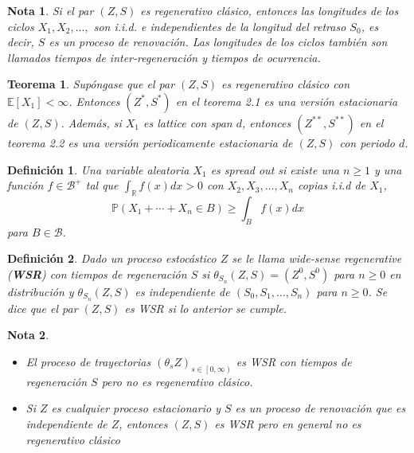 \documentclass{article}
\newtheorem{Def}{Definición}
\newtheorem{Teo}{Teorema}
\newtheorem{Note}{Nota}
\newcommand{\rea}{\mathbb{R}}
\newcommand{\esp}{\mathbb{E}}
\newcommand{\prob}{\mathbb{P}}
\begin{document}
\begin{Note}
Si el par $\left(Z,S\right)$ es regenerativo cl\'asico, entonces las longitudes de los ciclos $X_{1},X_{2},\ldots,$ son i.i.d. e independientes de la longitud del retraso $S_{0}$, es decir, $S$ es un proceso de renovaci\'on. Las longitudes de los ciclos tambi\'en son llamados tiempos de inter-regeneraci\'on y tiempos de ocurrencia.

\end{Note}

\begin{Teo}
Sup\'ongase que el par $\left(Z,S\right)$ es regenerativo cl\'asico con $\esp\left[X_{1}\right]<\infty$. Entonces $\left(Z^{*},S^{*}\right)$ en el teorema 2.1 es una versi\'on estacionaria de $\left(Z,S\right)$. Adem\'as, si $X_{1}$ es lattice con span $d$, entonces $\left(Z^{**},S^{**}\right)$ en el teorema 2.2 es una versi\'on periodicamente estacionaria de $\left(Z,S\right)$ con periodo $d$.

\end{Teo}

\begin{Def}
Una variable aleatoria $X_{1}$ es \textit{spread out} si existe una $n\geq1$ y una  funci\'on $f\in\mathcal{B}^{+}$ tal que $\int_{\rea}f\left(x\right)dx>0$ con $X_{2},X_{3},\ldots,X_{n}$ copias i.i.d  de $X_{1}$, $$\prob\left(X_{1}+\cdots+X_{n}\in B\right)\geq\int_{B}f\left(x\right)dx$$ para $B\in\mathcal{B}$.

\end{Def}



\begin{Def}
Dado un proceso estoc\'astico $Z$ se le llama \textit{wide-sense regenerative} (\textbf{WSR}) con tiempos de regeneraci\'on $S$ si $\theta_{S_{n}}\left(Z,S\right)=\left(Z^{0},S^{0}\right)$ para $n\geq0$ en distribuci\'on y $\theta_{S_{n}}\left(Z,S\right)$ es independiente de $\left(S_{0},S_{1},\ldots,S_{n}\right)$ para $n\geq0$.
Se dice que el par $\left(Z,S\right)$ es WSR si lo anterior se cumple.
\end{Def}


\begin{Note}
\begin{itemize}
\item El proceso de trayectorias $\left(\theta_{s}Z\right)_{s\in\left[0,\infty\right)}$ es WSR con tiempos de regeneraci\'on $S$ pero no es regenerativo cl\'asico.

\item Si $Z$ es cualquier proceso estacionario y $S$ es un proceso de renovaci\'on que es independiente de $Z$, entonces $\left(Z,S\right)$ es WSR pero en general no es regenerativo cl\'asico

\end{itemize}

\end{Note}
\end{document}
